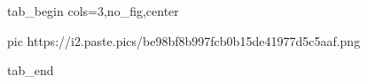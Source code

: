  
 
 
 
 


\ifcmt
  tab_begin cols=3,no_fig,center

     pic https://i2.paste.pics/be98bf8b997fcb0b15de41977d5c5aaf.png

  tab_end
\fi
